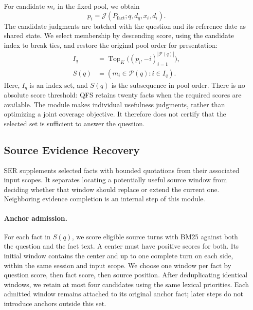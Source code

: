 \documentclass[11pt]{article}
\newcommand{\qfs}{\textsc{QFS}}
\newcommand{\ser}{\textsc{SER}}
\newcommand{\jev}{\mathcal{J}}
\newcommand{\topk}{\operatorname{Top}}
\begin{document}
For candidate $m_i$ in the fixed pool, we obtain
\begin{equation}
 p_i = \jev(P_{\mathrm{fact}};q,d_q,x_i,d_i).
 \label{eq:fact-score}
\end{equation}
The candidate judgments are batched with the question and its reference date as shared state. We select membership by descending score, using the candidate index to break ties, and restore the original pool order for presentation:
\begin{equation}
 \begin{aligned}
 I_q &= \topk_K\bigl((p_i,-i)_{i=1}^{|\mathcal{P}(q)|}\bigr),\\
 S(q) &= (m_i\in\mathcal{P}(q):i\in I_q).
 \end{aligned}
 \label{eq:fact-selection}
\end{equation}
Here, $I_q$ is an index set, and $S(q)$ is the subsequence in pool order. There is no absolute score threshold: \qfs{} retains twenty facts when the required scores are available. The module makes individual usefulness judgments, rather than optimizing a joint coverage objective. It therefore does not certify that the selected set is sufficient to answer the question.

\subsection{Source Evidence Recovery}
\label{sec:ser}
\ser{} supplements selected facts with bounded quotations from their associated input scopes. It separates locating a potentially useful source window from deciding whether that window should replace or extend the current one. Neighboring evidence completion is an internal step of this module.

\paragraph{Anchor admission.}
For each fact in $S(q)$, we score eligible source turns with BM25 against both the question and the fact text. A center must have positive scores for both. Its initial window contains the center and up to one complete turn on each side, within the same session and input scope. We choose one window per fact by question score, then fact score, then source position. After deduplicating identical windows, we retain at most four candidates using the same lexical priorities. Each admitted window remains attached to its original anchor fact; later steps do not introduce anchors outside this set.
\end{document}
